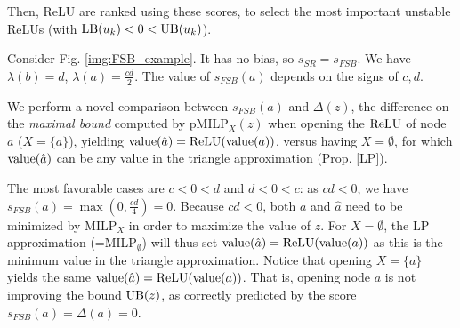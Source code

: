 	
	Then, ReLU are ranked using these scores, to select the most important unstable ReLUs
	(with $\mathrm{LB}(u_k) < 0 < \mathrm{UB}(u_k)$).
	


	
 Consider Fig. \ref{img:FSB_example}. 
It has no bias, so $s_{SR}=s_{FSB}$. We have $\lambda(b)=d$, $\lambda(a)=\frac{cd}{2}$.
The value of $s_{FSB}(a)$ depends on the signs of $c,d$.

We perform a novel comparison between $s_{FSB}(a)$ and $\Delta(z)$, the difference on the {\em maximal bound} computed by pMILP$_X(z)$ when opening the $\mathrm{ReLU}$ of node $a$ ($X=\{a\}$), yielding ${\textrm{value}}(\hat{a}) = \mathrm{ReLU}({\textrm{value}}(a))$, versus having $X=\emptyset$, for which 
${\textrm{value}}(\hat{a})$ can be any value in the triangle approximation (Prop. \ref{LP}).


The most favorable cases are $c < 0 < d$ and $d < 0 < c$: 
as $cd <0$, we have $s_{FSB}(a)=\max(0,\frac{cd}{4}) = 0$.
Because $cd <0$, both $a$ and $\hat{a}$ need to be minimized by MILP$_X$ in order to maximize the value of $z$. For $X=\emptyset$, the LP approximation (=MILP$_\emptyset$) will thus 
set ${\textrm{value}}(\hat{a}) = \mathrm{ReLU}({\textrm{value}}(a))$ as this is the minimum value in the triangle approximation. Notice that opening $X=\{a\}$ yields the same ${\textrm{value}}(\hat{a}) = \mathrm{ReLU}({\textrm{value}}(a))$.
That is, opening node $a$ is not improving the bound $\mathrm{UB}(z)$, as correctly predicted by the score $s_{FSB}(a)= \Delta(a) = 0$.






